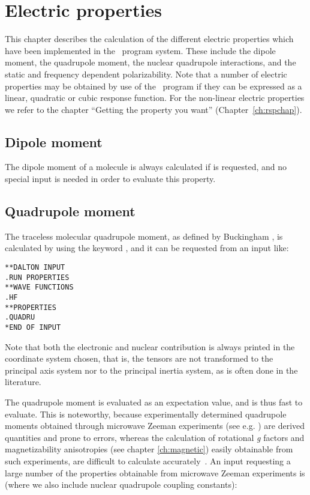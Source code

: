 \chapter{Electric properties}\label{ch:electric}

This chapter describes the calculation of the different electric
properties which have been implemented in the \siraba\ program system.
These include the dipole moment, the quadrupole
moment, the nuclear quadrupole 
interactions,  and the static and frequency dependent 
polarizability. Note that a number of electric
properties may be 
obtained by use of the \resp\ program if they can be expressed as a
linear, quadratic or cubic response function. For the non-linear
electric properties we refer to the chapter ``Getting the property you
want'' (Chapter~\ref{ch:rspchap}).

\section{Dipole moment}\label{sec:dipmom}

The dipole moment of a  molecule is always
calculated if  is 
requested, and no special input is needed in order to evaluate this property.

\section{Quadrupole moment}\label{sec:quadmom}

The traceless molecular quadrupole moment, as
defined by Buckingham 
\cite{adbacp12}, is calculated by using the keyword , and
it can be requested from an input like:

\begin{verbatim}
**DALTON INPUT
.RUN PROPERTIES
**WAVE FUNCTIONS
.HF
**PROPERTIES
.QUADRU
*END OF INPUT
\end{verbatim}

Note that both the electronic and nuclear contribution is always
printed in the coordinate system chosen, that is, the tensors are not
transformed to the principal axis system nor to the principal inertia
system, as is often done in the literature. 

The quadrupole moment is evaluated as an expectation value, and is
thus fast to evaluate. This is noteworthy, because experimentally
determined quadrupole moments obtained through microwave Zeeman experiments
(see e.g.  \cite{whmklwhfjcp48,jsdhszna46}) are derived
quantities and prone to errors,
whereas the calculation of rotational {\em g} factors and magnetizability
anisotropies (see chapter
\ref{ch:magnetic}) easily obtainable from such 
experiments, are difficult to calculate accurately~\cite{krthcpl264}. An input
requesting a large number of the properties obtainable from microwave
Zeeman experiments is (where we also include nuclear quadrupole
coupling constants): 

